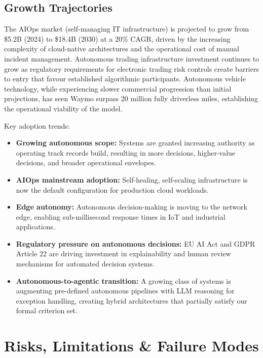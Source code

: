 \documentclass[12pt, a4paper]{article}
\begin{document}
\subsection{Growth Trajectories}
The AIOps market (self-managing IT infrastructure) is projected to grow from \$5.2B (2024) to \$18.4B (2030) at a 20\% CAGR, driven by the increasing complexity of cloud-native architectures and the operational cost of manual incident management. Autonomous trading infrastructure investment continues to grow as regulatory requirements for electronic trading risk controls create barriers to entry that favour established algorithmic participants. Autonomous vehicle technology, while experiencing slower commercial progression than initial projections, has seen Waymo surpass 20 million fully driverless miles, establishing the operational viability of the model.

Key adoption trends:
\begin{itemize}
    \item \textbf{Growing autonomous scope:} Systems are granted increasing authority as operating track records build, resulting in more decisions, higher-value decisions, and broader operational envelopes.
    \item \textbf{AIOps mainstream adoption:} Self-healing, self-scaling infrastructure is now the default configuration for production cloud workloads.
    \item \textbf{Edge autonomy:} Autonomous decision-making is moving to the network edge, enabling sub-millisecond response times in IoT and industrial applications.
    \item \textbf{Regulatory pressure on autonomous decisions:} EU AI Act and GDPR Article 22 are driving investment in explainability and human review mechanisms for automated decision systems.
    \item \textbf{Autonomous-to-agentic transition:} A growing class of systems is augmenting pre-defined autonomous pipelines with LLM reasoning for exception handling, creating hybrid architectures that partially satisfy our formal criterion set.
\end{itemize}

\section{Risks, Limitations \& Failure Modes}\label{sec:risks}
\end{document}
